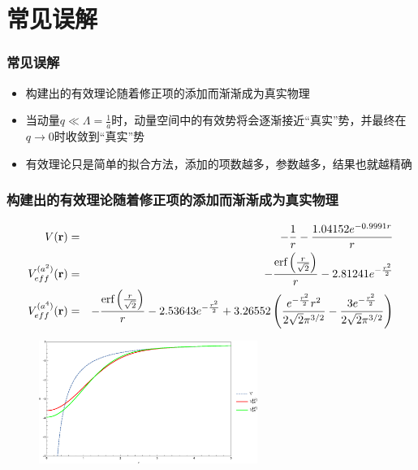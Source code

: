 \documentclass[8pt]{beamer}
\begin{document}
\section{常见误解}
\begin{frame}
\frametitle{常见误解}
\begin{itemize}
  \item 构建出的有效理论随着修正项的添加而渐渐成为真实物理
  \vspace{12pt}
  \item 当动量$q\ll\Lambda=\displaystyle\frac{1}{a}$时，动量空间中的有效势将会逐渐接近“真实”势，并最终在$q\rightarrow0$时收敛到“真实”势
  \vspace{12pt}
  \item 有效理论只是简单的拟合方法，添加的项数越多，参数越多，结果也就越精确
\end{itemize}

\end{frame}

\begin{frame}
\frametitle{构建出的有效理论随着修正项的添加而渐渐成为真实物理}
\footnotesize
\begin{eqnarray}\label{realpo}
	V(\vb{r}) &=& -\frac{1}{r}-\frac{1.04152 e^{-0.9991 r}}{r} \\
	\label{effa2} V_{eff}^{(a^2)}(\vb{r}) &=& -\frac{\text{erf}\left(\frac{r}{\sqrt{2}}\right)}{r}-2.81241 e^{-\frac{r^2}{2}} \\
	\label{effa4} V_{eff}^{(a^4)}(\vb{r}) &=& -\frac{\text{erf}\left(\frac{r}{\sqrt{2}}\right)}{r}-2.53643 e^{-\frac{r^2}{2}}+3.26552 \left(\frac{e^{-\frac{r^2}{2}} r^2}{2 \sqrt{2} \pi ^{3/2}}-\frac{3 e^{-\frac{r^2}{2}}}{2 \sqrt{2} \pi ^{3/2}}\right)
\end{eqnarray}
\begin{figure}[!hbp]
	\centering
	\includegraphics[width=2.8in]{NoFourierTransformation.eps}
\end{figure}
\end{frame}
\end{document}
